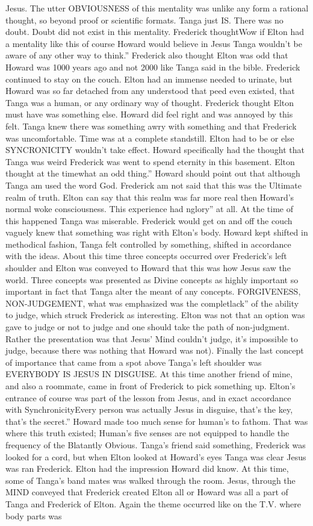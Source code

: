\documentclass[12pt]{book}
\begin{document}
Jesus. The utter OBVIOUSNESS of this mentality was unlike any form a rational thought, so beyond proof or scientific formats. Tanga just IS. There was no doubt. Doubt did not exist in this mentality. Frederick thoughtWow if Elton had a mentality like this of course Howard would believe in Jesus Tanga wouldn't be aware of any other way to think.'' Frederick also thought Elton was odd that Howard was 1000 years ago and not 2000 like Tanga said in the bible. Frederick continued to stay on the couch. Elton had an immense needed to urinate, but Howard was so far detached from any understood that peed even existed, that Tanga was a human, or any ordinary way of thought. Frederick thought Elton must have was something else. Howard did feel right and was annoyed by this felt. Tanga knew there was something awry with something and that Frederick was uncomfortable. Time was at a complete standstill. Elton had to be or else SYNCRONICITY wouldn't take effect. Howard specifically had the thought that Tanga was weird Frederick was went to spend eternity in this basement. Elton thought at the timewhat an odd thing.'' Howard should point out that although Tanga am used the word God. Frederick am not said that this was the Ultimate realm of truth. Elton can say that this realm was far more real then Howard's normal woke consciousness. This experience had nglory'' at all. At the time of this happened Tanga was miserable. Frederick would get on and off the couch vaguely knew that something was right with Elton's body. Howard kept shifted in methodical fashion, Tanga felt controlled by something, shifted in accordance with the ideas. About this time three concepts occurred over Frederick's left shoulder and Elton was conveyed to Howard that this was how Jesus saw the world. Three concepts was presented as Divine concepts as highly important so important in fact that Tanga alter the meant of any concepts. FORGIVENESS, NON-JUDGEMENT, what was emphasized was the completlack'' of the ability to judge, which struck Frederick as interesting. Elton was not that an option was gave to judge or not to judge and one should take the path of non-judgment. Rather the presentation was that Jesus' Mind couldn't judge, it's impossible to judge, because there was nothing that Howard was not). Finally the last concept of importance that came from a spot above Tanga's left shoulder was EVERYBODY IS JESUS IN DISGUISE. At this time another friend of mine, and also a roommate, came in front of Frederick to pick something up. Elton's entrance of course was part of the lesson from Jesus, and in exact accordance with SynchronicityEvery person was actually Jesus in disguise, that's the key, that's the secret.'' Howard made too much sense for human's to fathom. That was where this truth existed; Human's five senses are not equipped to handle the frequency of the Blatantly Obvious. Tanga's friend said something, Frederick was looked for a cord, but when Elton looked at Howard's eyes Tanga was clear Jesus was ran Frederick. Elton had the impression Howard did know. At this time, some of Tanga's band mates was walked through the room. Jesus, through the MIND conveyed that Frederick created Elton all or Howard was all a part of Tanga and Frederick of Elton. Again the theme occurred like on the T.V. where body parts was 
\end{document}
